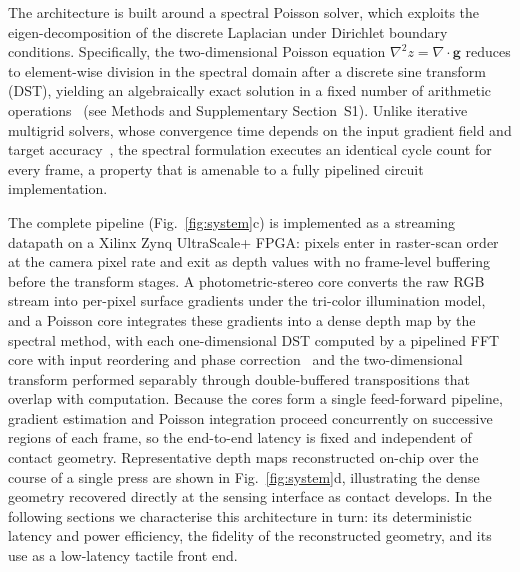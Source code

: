 \documentclass[10pt,a4paper]{article}
\begin{document}
The architecture is built around a spectral Poisson solver, which exploits the eigen-decomposition of the discrete Laplacian under Dirichlet boundary conditions.
Specifically, the two-dimensional Poisson equation $\nabla^2 z = \nabla \cdot \mathbf{g}$ reduces to element-wise division in the spectral domain after a discrete sine transform (DST), yielding an algebraically exact solution in a fixed number of arithmetic operations~\cite{strang2007cse} (see Methods and Supplementary Section~S1). 
Unlike iterative multigrid solvers, whose convergence time depends on the input gradient field and target accuracy~\cite{elaraby2007multigridfpga,kamalakkannan2021fpgastencil}, the spectral formulation executes an identical cycle count for every frame, a property that is amenable to a fully pipelined circuit implementation.

The complete pipeline (Fig.~\ref{fig:system}c) is implemented as a streaming datapath on a Xilinx Zynq UltraScale+ FPGA: pixels enter in raster-scan order at the camera pixel rate and exit as depth values with no frame-level buffering before the transform stages. 
A photometric-stereo core converts the raw RGB stream into per-pixel surface gradients under the tri-color illumination model, and a Poisson core integrates these gradients into a dense depth map by the spectral method, with each one-dimensional DST computed by a pipelined FFT core with input reordering and phase correction~\cite{makhoul1980fct} and the two-dimensional transform performed separably through double-buffered transpositions that overlap with computation. 
Because the cores form a single feed-forward pipeline, gradient estimation and Poisson integration proceed concurrently on successive regions of each frame, so the end-to-end latency is fixed and independent of contact geometry. 
Representative depth maps reconstructed on-chip over the course of a single press are shown in Fig.~\ref{fig:system}d, illustrating the dense geometry recovered directly at the sensing interface as contact develops.
In the following sections we characterise this architecture in turn: its deterministic latency and power efficiency, the fidelity of the reconstructed geometry, and its use as a low-latency tactile front end.
\end{document}
